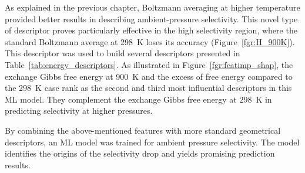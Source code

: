 \documentclass[main]{subfiles}
\begin{document}
As explained in the previous chapter, Boltzmann averaging at higher temperature provided better results in describing ambient-pressure selectivity. 
This novel type of descriptor proves particularly effective in the high selectivity region, where the standard Boltzmann average at \SI{298}{\kelvin} loses its accuracy (Figure~\ref{fgr:H_900K}). This descriptor was used to build several descriptors presented in Table~\ref{tab:energy_descriptors}. As illustrated in Figure~\ref{fgr:featimp_shap}, the exchange Gibbs free energy at \SI{900}{\kelvin} and the excess of free energy compared to the \SI{298}{\kelvin} case rank as the second and third most influential descriptors in this ML model. They complement the exchange Gibbs free energy at \SI{298}{\kelvin} in predicting selectivity at higher pressures.

By combining the above-mentioned features with more standard geometrical descriptors, an ML model was trained for ambient pressure selectivity. The model identifies the origins of the selectivity drop and yields promising prediction results.

\clearpage
\end{document}
